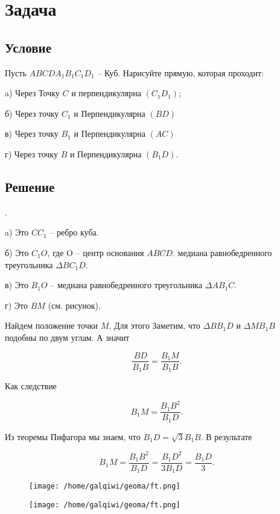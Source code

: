 



\section{Задача}

\subsection{Условие}

Пусть $ABCDA_1B_1C_1D_1$ -- Куб. Нарисуйте прямую, которая проходит:

a) Через Точку $C$ и перпендикулярна $(C_1D_1)$;

б) Через точку $C_1$ и Перпендикулярна $(BD)$

в) Через точку $B_1$ и Перпендикулярна $(AC)$

г) Через точку $B$ и Перпендикулярна $(B_1D)$.

\subsection{Решение}
.

\indent a) Это $CC_1$ -- ребро куба.

б) Это $C_1O$, где O -- центр основания $ABCD$. медиана равнобедренного треугольника $\Delta BC_1D$.

в) Это $B_1O$ -- медиана равнобедренного треугольника $\Delta AB_1C$.

г) Это $BM$ (см. рисунок).

\vspace{0.5 cm}

 Найдем положение точки $M$. Для этого Заметим, что $\Delta BB_1D$ и $\Delta MB_1B$ подобны по двум углам. А значит

\begin{equation}
	\frac{BD}{B_1B} = \frac{B_1M}{B_1B}.
\end{equation}

Как следствие

\begin{equation}
	B_1M = \frac{{B_1B}^2}{B_1D}.
\end{equation}

Из теоремы Пифагора мы знаем, что $B_1D = \sqrt{3} B_1B$. В результате

\begin{equation}
	B_1M = \frac{{B_1B}^2}{B_1D} = \frac{{B_1D}^2}{3B_1D} = \frac{B_1D}{3}.
\end{equation}
\begin{figure}[h]
	\centering
	\texttt{[image: /home/galqiwi/geoma/ft.png]}
\end{figure}
\begin{figure}[h]
	\centering
	\texttt{[image: /home/galqiwi/geoma/ft.png]}
\end{figure}
